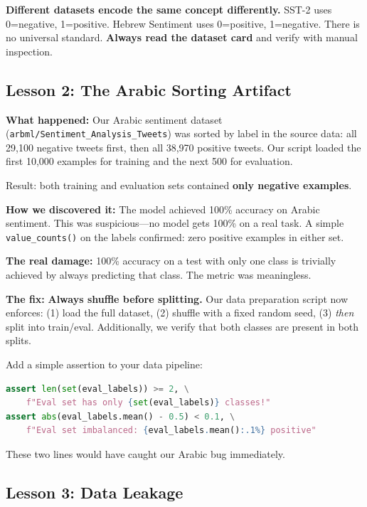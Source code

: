 \documentclass[11pt,a4paper]{article}
\begin{document}
\begin{warning}
\textbf{Different datasets encode the same concept differently.} SST-2 uses 0=negative, 1=positive. Hebrew Sentiment uses 0=positive, 1=negative. There is no universal standard. \textbf{Always read the dataset card} and verify with manual inspection.
\end{warning}

\subsection{Lesson 2: The Arabic Sorting Artifact}

\textbf{What happened:} Our Arabic sentiment dataset (\texttt{arbml/Sentiment\_Analysis\_Tweets}) was sorted by label in the source data: all 29,100 negative tweets first, then all 38,970 positive tweets. Our script loaded the first 10,000 examples for training and the next 500 for evaluation.

Result: both training and evaluation sets contained \textbf{only negative examples}.

\textbf{How we discovered it:} The model achieved 100\% accuracy on Arabic sentiment. This was suspicious---no model gets 100\% on a real task. A simple \texttt{value\_counts()} on the labels confirmed: zero positive examples in either set.

\textbf{The real damage:} 100\% accuracy on a test with only one class is trivially achieved by always predicting that class. The metric was meaningless.

\textbf{The fix:} \textbf{Always shuffle before splitting.} Our data preparation script now enforces: (1) load the full dataset, (2) shuffle with a fixed random seed, (3) \emph{then} split into train/eval. Additionally, we verify that both classes are present in both splits.

\begin{tip}
Add a simple assertion to your data pipeline:
\begin{lstlisting}[language=Python]
assert len(set(eval_labels)) >= 2, \
    f"Eval set has only {set(eval_labels)} classes!"
assert abs(eval_labels.mean() - 0.5) < 0.1, \
    f"Eval set imbalanced: {eval_labels.mean():.1%} positive"
\end{lstlisting}
These two lines would have caught our Arabic bug immediately.
\end{tip}

\subsection{Lesson 3: Data Leakage}
\end{document}
